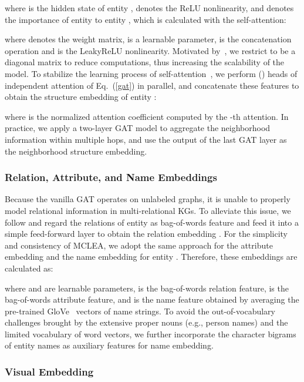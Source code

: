 \documentclass[11pt]{article}
\begin{document}
where  is the hidden state of entity ,  denotes the ReLU nonlinearity, and  denotes the importance of entity  to entity , which is calculated with the self-attention:

where  denotes the weight matrix,  is a learnable parameter,  is the concatenation operation and  is the LeakyReLU nonlinearity.
Motivated by~\cite{li2019semi}, we restrict  to be a diagonal matrix to reduce computations, thus increasing the scalability of the model.
To stabilize the learning process of self-attention~\cite{velivckovic2018graph}, we perform  () heads of independent attention of Eq.~(\ref{gat}) in parallel, and concatenate these features to obtain the structure embedding of entity :

where  is the normalized attention coefficient computed by the -th attention.
In practice, we apply a two-layer GAT model to aggregate the neighborhood information within multiple hops, and use the output of the last GAT layer as the neighborhood structure embedding.


\subsubsection{Relation, Attribute, and Name Embeddings}







Because the vanilla GAT operates on unlabeled graphs, it is unable to properly model relational information in multi-relational KGs.
To alleviate this issue, we follow \cite{yang2019aligning} and regard the relations of entity  as bag-of-words feature and feed it into a simple feed-forward layer to obtain the relation embedding .
For the simplicity and consistency of MCLEA, we adopt the same approach for the attribute embedding  and the name embedding  for entity .
Therefore, these embeddings are calculated as:

where  and  are learnable parameters,  is the bag-of-words relation feature,  is the bag-of-words attribute feature, and  is the name feature obtained by averaging the pre-trained GloVe~\cite{pennington2014glove} vectors of name strings.
To avoid the out-of-vocabulary challenges brought by the extensive proper nouns (e.g., person names) and the limited vocabulary of word vectors, we further incorporate the character bigrams~\cite{mao2021alignment} of entity names as auxiliary features for name embedding.

\subsubsection{Visual Embedding}
\end{document}

